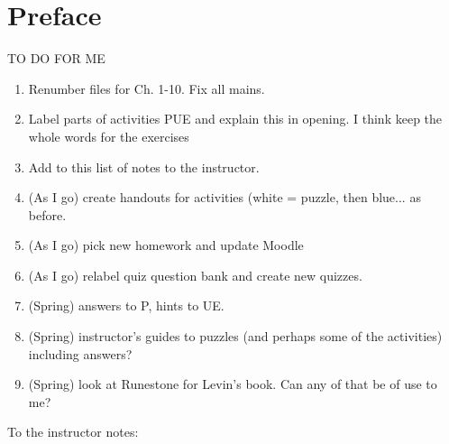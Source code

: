 \section*{Preface}

TO DO FOR ME

\begin{enumerate}
    \item Renumber files for Ch. 1-10.  Fix all mains.
    \item Label parts of activities PUE and explain this in opening.  I think keep the whole words for the exercises
    \item Add to this list of notes to the instructor.
    \item (As I go)  create handouts for activities (white = puzzle, then blue... as before.
    \item (As I go) pick new homework and update Moodle
    \item (As I go) relabel quiz question bank and create new quizzes.
    \item (Spring) answers to P, hints to UE.
    \item (Spring) instructor's guides to puzzles (and perhaps some of the activities) including answers?
    \item (Spring) look at Runestone for Levin's book.  Can any of that be of use to me?

\end{enumerate}

To the instructor notes:

